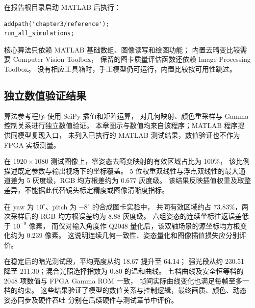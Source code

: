 在报告根目录启动 MATLAB 后执行：
\begin{verbatim}
addpath('chapter3/reference');
run_all_simulations;
\end{verbatim}
核心算法只依赖 MATLAB 基础数组、图像读写和绘图功能；
内置去畸变比较需要 Computer Vision Toolbox，
保留的图卡质量评估函数还依赖 Image Processing Toolbox。
没有相应工具箱时，手工模型仍可运行，内置比较按可用性跳过。

\subsection{独立数值验证结果}
算法参考程序  使用 SciPy 插值和矩阵运算，
对几何映射、颜色重采样与 Gamma 控制关系进行独立数值验证。
本章图示与数值均来自该程序；MATLAB 程序提供同模型复现入口，
未列入已执行的 MATLAB 测试结果，数值验证也不作为 FPGA 实板测量。

在 $1920\times1080$ 测试图像上，零姿态去畸变映射的有效区域占比为 100\%，
该比例描述既定参数与输出视场下的坐标覆盖。
5 位权重双线性与浮点双线性的最大通道差为 5 灰度级，RGB 均方根差约为 0.677 灰度级。
该结果反映插值权重及取整差异，不能据此代替镜头标定精度或图像清晰度指标。

在 yaw 为 $10^\circ$、pitch 为 $-8^\circ$ 的合成图卡实验中，
共同有效区域约占 73.83\%，两次采样后的 RGB 均方根误差约为 8.88 灰度级。
六组姿态的连续坐标往返误差低于 $10^{-9}$ 像素，
而仅对输入角度作 Q2048 量化后，该双轴场景的源坐标均方根变化约为 0.239 像素。
这说明连续几何一致性、姿态量化和图像插值损失应分别评价。

在稳定后的暗光测试段，平均亮度从约 18.67 提升至 64.14；
强光段从约 230.51 降至 211.30；混合光照选择指数为 0.80 的温和曲线。
七档曲线及安全恒等档的 2048 项数值与 FPGA Gamma ROM 一致，
帧间实际曲线变化也满足每帧至多一档的约束。
这些结果验证了模型的数值关系与控制逻辑，最终画质、颜色、动态姿态同步及硬件吞吐
分别在后续硬件与测试章节中评价。
